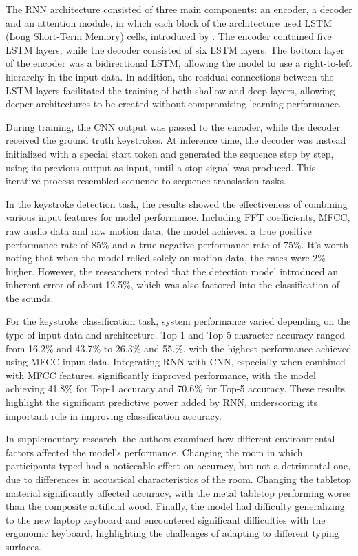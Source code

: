 \documentclass[a4paper,11pt,twoside]{report}
\theoremstyle{definition}
\begin{document}
The RNN architecture consisted of three main components: an encoder, a decoder and an attention module, in which each block of the architecture used LSTM (Long Short-Term Memory) cells, introduced by \cite{lstm}. The encoder contained five LSTM layers, while the decoder consisted of six LSTM layers. The bottom layer of the encoder was a bidirectional LSTM, allowing the model to use a right-to-left hierarchy in the input data. In addition, the residual connections between the LSTM layers facilitated the training of both shallow and deep layers, allowing deeper architectures to be created without compromising learning performance.

During training, the CNN output was passed to the encoder, while the decoder received the ground truth keystrokes. At inference time, the decoder was instead initialized with a special start token and generated the sequence step by step, using its previous output as input, until a stop signal was produced. This iterative process resembled sequence-to-sequence translation tasks.

In the keystroke detection task, the results showed the effectiveness of combining various input features for model performance. Including FFT coefficients, MFCC, raw audio data and raw motion data, the model achieved a true positive performance rate of 85\% and a true negative performance rate of 75\%. It's worth noting that when the model relied solely on motion data, the rates were 2\% higher. However, the researchers noted that the detection model introduced an inherent error of about 12.5\%, which was also factored into the classification of the sounds.

For the keystroke classification task, system performance varied depending on the type of input data and architecture. Top-1 and Top-5 character accuracy ranged from 16.2\% and 43.7\% to 26.3\% and 55.\%, with the highest performance achieved using MFCC input data. Integrating RNN with CNN, especially when combined with MFCC features, significantly improved performance, with the model achieving 41.8\% for Top-1 accuracy and 70.6\% for Top-5 accuracy. These results highlight the significant predictive power added by RNN, underscoring its important role in improving classification accuracy.

In supplementary research, the authors examined how different environmental factors affected the model's performance. Changing the room in which participants typed had a noticeable effect on accuracy, but not a detrimental one, due to differences in acoustical characteristics of the room. Changing the tabletop material significantly affected accuracy, with the metal tabletop performing worse than the composite artificial wood. Finally, the model had difficulty generalizing to the new laptop keyboard and encountered significant difficulties with the ergonomic keyboard, highlighting the challenges of adapting to different typing surfaces.\\
\end{document}
